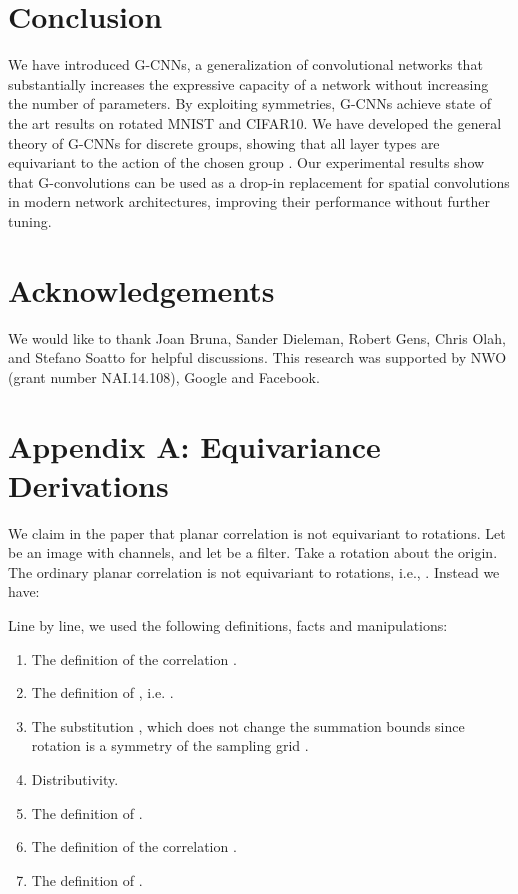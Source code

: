 \documentclass{article}
\begin{document}
\section{Conclusion}
\label{sec:conclusion}
We have introduced G-CNNs, a generalization of convolutional networks that 
substantially increases the expressive capacity of a network without increasing the number of parameters.
By exploiting symmetries, G-CNNs achieve state of the art results on rotated MNIST and CIFAR10.
We have developed the general theory of G-CNNs for discrete groups, showing that all layer types are equivariant to the action of the chosen group .
Our experimental results show that G-convolutions can be used as a drop-in replacement for spatial convolutions in modern network architectures, improving their performance without further tuning.


\section*{Acknowledgements}
We would like to thank Joan Bruna, Sander Dieleman, Robert Gens, Chris Olah, and Stefano Soatto for helpful discussions.
This research was supported by NWO (grant number NAI.14.108), Google and Facebook.





\newpage
\section*{Appendix A: Equivariance Derivations}

We claim in the paper that planar correlation is not equivariant to rotations.
Let  be an image with  channels, and let  be a filter.
Take a rotation  about the origin.
The ordinary planar correlation  is not equivariant to rotations, i.e., .
Instead we have:


Line by line, we used the following definitions, facts and manipulations:
\begin{enumerate}
  \item The definition of the correlation .
  \item The definition of , i.e. .
  \item The substitution , which does not change the summation bounds since rotation is a symmetry of the sampling grid .
  \item Distributivity.
  \item The definition of .
  \item The definition of the correlation .
  \item The definition of .
\end{enumerate}
\end{document}
